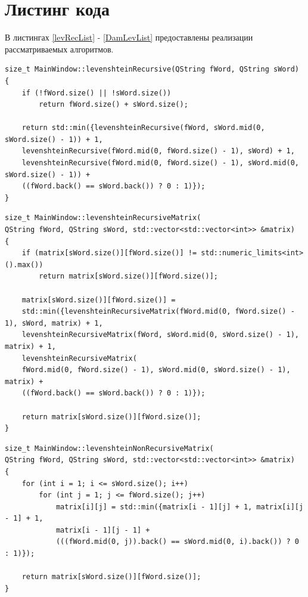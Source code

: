 \documentclass[12pt]{report}
\begin{document}
\section{Листинг кода}
В листингах \ref{levRecList} - \ref{DamLevList} предоставлены реализации рассматриваемых алгоритмов.
\begin{lstlisting}[caption=Функция реализации рекурсивного алгоритма Левенштейна,
label={levRecList}]
size_t MainWindow::levenshteinRecursive(QString fWord, QString sWord)
{
    if (!fWord.size() || !sWord.size())
        return fWord.size() + sWord.size();

    return std::min({levenshteinRecursive(fWord, sWord.mid(0, sWord.size() - 1)) + 1,
    levenshteinRecursive(fWord.mid(0, fWord.size() - 1), sWord) + 1,
    levenshteinRecursive(fWord.mid(0, fWord.size() - 1), sWord.mid(0, sWord.size() - 1)) +
    ((fWord.back() == sWord.back()) ? 0 : 1)});
}
\end{lstlisting}

\begin{lstlisting}[caption=Функция реализации рекурсивного алгоритма Левенштейна с использованием матрицы расстояний,
label={levRecMatList}]
size_t MainWindow::levenshteinRecursiveMatrix(
QString fWord, QString sWord, std::vector<std::vector<int>> &matrix)
{
    if (matrix[sWord.size()][fWord.size()] != std::numeric_limits<int>().max())
        return matrix[sWord.size()][fWord.size()];

    matrix[sWord.size()][fWord.size()] =
    std::min({levenshteinRecursiveMatrix(fWord.mid(0, fWord.size() - 1), sWord, matrix) + 1,
    levenshteinRecursiveMatrix(fWord, sWord.mid(0, sWord.size() - 1), matrix) + 1,
    levenshteinRecursiveMatrix(
    fWord.mid(0, fWord.size() - 1), sWord.mid(0, sWord.size() - 1), matrix) +
    ((fWord.back() == sWord.back()) ? 0 : 1)});

    return matrix[sWord.size()][fWord.size()];
}
\end{lstlisting}

\begin{lstlisting}[caption=Функция реализации итеративного алгоритма Левенштейна,
label={levIterList}]
size_t MainWindow::levenshteinNonRecursiveMatrix(
QString fWord, QString sWord, std::vector<std::vector<int>> &matrix)
{
    for (int i = 1; i <= sWord.size(); i++)
        for (int j = 1; j <= fWord.size(); j++)
            matrix[i][j] = std::min({matrix[i - 1][j] + 1, matrix[i][j - 1] + 1,
            matrix[i - 1][j - 1] +
            (((fWord.mid(0, j)).back() == sWord.mid(0, i).back()) ? 0 : 1)});

    return matrix[sWord.size()][fWord.size()];
}
\end{lstlisting}
\end{document}
